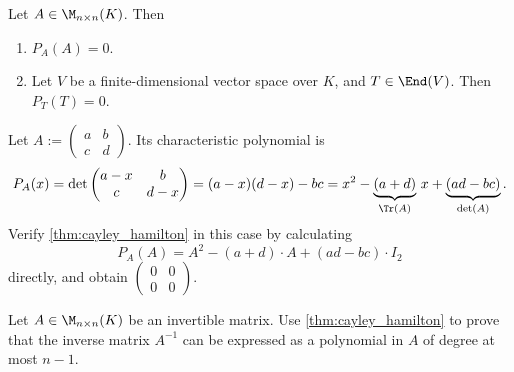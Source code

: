 \begin{theorem}
  \label{thm:cayley_hamilton}
  Let $A \in \M_{n \times n}(K)$. Then
  \begin{enumerate}[label=\textbf{(\alph*)}]
    \item  $P_A(A) = 0$.
    \item Let $V$ be a finite-di\-men\-sional vector space over $K$, and $T \in \End(V)$. Then $P_T(T) = 0$.
  \end{enumerate}
\end{theorem}

\begin{exercise}\label{ex:cayley_2x2}
  Let $A := \left(\begin{smallmatrix} a & b \\ c & d \end{smallmatrix}\right)$. Its characteristic polynomial is
  \[ P_A(x) = \det\begin{pmatrix} a-x & b \\ c & d-x \end{pmatrix} = (a-x)(d-x) - bc = x^2 - \underbrace{(a+d)}_{\Tr(A)} \, x + \underbrace{(ad-bc)}_{\det(A)}. \]
  Verify \cref{thm:cayley_hamilton} in this case by calculating
  \[ P_A(A) = A^2 - (a+d) \cdot A + (ad-bc) \cdot I_2 \]
  directly, and obtain $\left(\begin{smallmatrix} 0 & 0 \\ 0 & 0 \end{smallmatrix}\right)$.
\end{exercise}

\begin{exercise}\label{ex:cayley_inverse}
  Let $A \in \M_{n \times n}(K)$ be an invertible matrix. Use \cref{thm:cayley_hamilton} to prove that the inverse matrix $A^{-1}$ can be expressed as a polynomial in $A$ of degree at most $n-1$.
\end{exercise}

